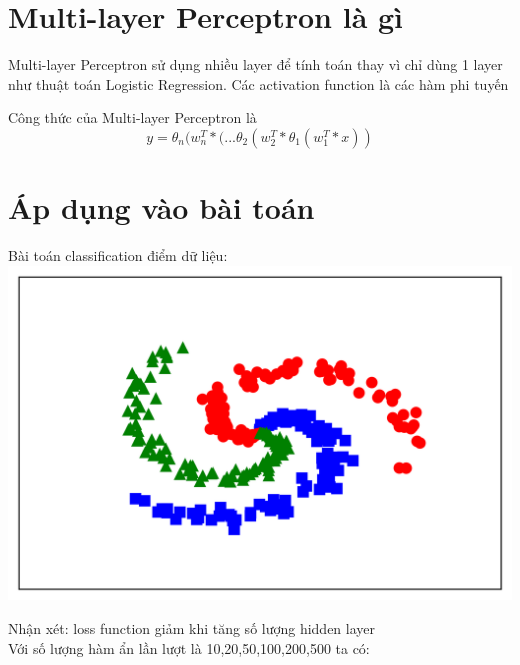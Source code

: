 \documentclass[12pt,letterpaper]{article}
\begin{document}
\section*{Multi-layer Perceptron là gì}
Multi-layer Perceptron sử dụng nhiều layer để tính toán thay vì chỉ dùng 1 layer như thuật toán Logistic Regression.
Các activation function là các hàm phi tuyến

Công thức của Multi-layer Perceptron là 
$$
    y =  \theta_n(w_n^T*(...\theta_2(w_2^T*\theta_1(w_1^T*x))
$$
\section*{Áp dụng vào bài toán}
Bài toán classification điểm dữ liệu:
\\
\includegraphics[width=1 \linewidth]{EX.png}

Nhận xét: loss function giảm khi tăng số lượng hidden layer\\
Với số lượng hàm ẩn lần lượt là 10,20,50,100,200,500 ta có:
\end{document}
